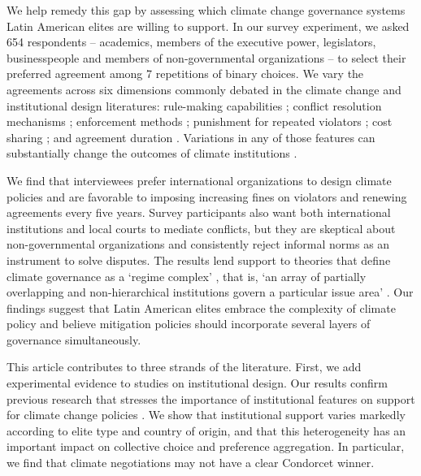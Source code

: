 \documentclass[a4paper,12pt]{article}
\begin{document}
We help remedy this gap by assessing which climate change governance systems Latin American elites are willing to support. In our survey experiment, we asked 654 respondents -- academics, members of the executive power, legislators, businesspeople and members of non-governmental organizations -- to select their preferred agreement among 7 repetitions of binary choices. We vary the agreements across six dimensions commonly debated in the climate change and institutional design literatures: rule-making capabilities \citep{dubash2013developments, massey2014climate}; conflict resolution mechanisms \citep{huntjens2012institutional, ostrom2014polycentric}; enforcement methods \citep{barrett2008climate}; punishment for repeated violators \citep{ostrom1990governing}; cost sharing \citep{bechtel2013mass}; and agreement duration \citep{copelovitch2014design, marcoux2009institutional}. Variations in any of those features can substantially change the outcomes of climate institutions \citep{bodin2017collaborative, ostrom2014polycentric}.

We find that interviewees prefer international organizations to design climate policies and are favorable to imposing increasing fines on violators and renewing agreements every five years. Survey participants also want both international institutions and local courts to mediate conflicts, but they are skeptical about non-governmental organizations and consistently reject informal norms as an instrument to solve disputes. The results lend support to theories that define climate governance as a `regime complex' \citep{colgan2012punctuated,keohane2011regime}, that is, `an array of partially overlapping and non-hierarchical institutions govern a particular issue area' \citep[279]{raustiala2004regime}. Our findings suggest that Latin American elites embrace the complexity of climate policy and believe mitigation policies should incorporate several layers of governance simultaneously.

This article contributes to three strands of the literature. First, we add experimental evidence to studies on institutional design. Our results confirm previous research that stresses the importance of institutional features on support for climate change policies \citep{aklin2013understanding, bechtel2013mass, bechtel2017interests}. We show that institutional support varies markedly according to elite type and country of origin, and that this heterogeneity has an important impact on collective choice and preference aggregation. In particular, we find that climate negotiations may not have a clear Condorcet winner.
\end{document}
